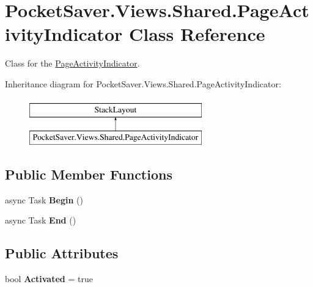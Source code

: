 \hypertarget{class_pocket_saver_1_1_views_1_1_shared_1_1_page_activity_indicator}{}\section{Pocket\+Saver.\+Views.\+Shared.\+Page\+Activity\+Indicator Class Reference}
\label{class_pocket_saver_1_1_views_1_1_shared_1_1_page_activity_indicator}


Class for the \hyperlink{class_pocket_saver_1_1_views_1_1_shared_1_1_page_activity_indicator}{Page\+Activity\+Indicator}.  


Inheritance diagram for Pocket\+Saver.\+Views.\+Shared.\+Page\+Activity\+Indicator\+:\begin{figure}[H]
\begin{center}
\leavevmode
\includegraphics[height=2.000000cm]{class_pocket_saver_1_1_views_1_1_shared_1_1_page_activity_indicator}
\end{center}
\end{figure}
\subsection*{Public Member Functions}
\begin{DoxyCompactItemize}
\item 
\mbox{\label{class_pocket_saver_1_1_views_1_1_shared_1_1_page_activity_indicator_a11a3ee43d93c39e168dde85c60ee02ce}} 
async Task {\bfseries Begin} ()
\item 
\mbox{\label{class_pocket_saver_1_1_views_1_1_shared_1_1_page_activity_indicator_a508cd9e1cbd2984270f403249a986d8d}} 
async Task {\bfseries End} ()
\end{DoxyCompactItemize}
\subsection*{Public Attributes}
\begin{DoxyCompactItemize}
\item 
\mbox{\label{class_pocket_saver_1_1_views_1_1_shared_1_1_page_activity_indicator_a36cdc07ae4b40eb9822603a03286272c}} 
bool {\bfseries Activated} = true
\end{DoxyCompactItemize}
